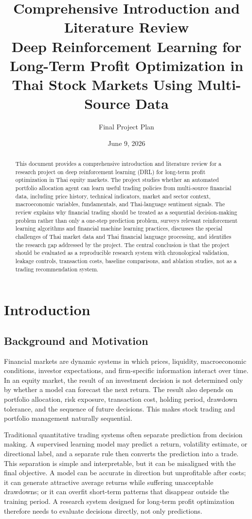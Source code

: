 \documentclass[11pt]{article}
\title{\textbf{Comprehensive Introduction and Literature Review}\\
Deep Reinforcement Learning for Long-Term Profit Optimization in Thai Stock Markets Using Multi-Source Data}
\author{Final Project Plan}
\date{June 9, 2026}
\begin{document}
\maketitle

\begin{abstract}
This document provides a comprehensive introduction and literature review for a research project on deep reinforcement learning (DRL) for long-term profit optimization in Thai equity markets. The project studies whether an automated portfolio allocation agent can learn useful trading policies from multi-source financial data, including price history, technical indicators, market and sector context, macroeconomic variables, fundamentals, and Thai-language sentiment signals. The review explains why financial trading should be treated as a sequential decision-making problem rather than only a one-step prediction problem, surveys relevant reinforcement learning algorithms and financial machine learning practices, discusses the special challenges of Thai market data and Thai financial language processing, and identifies the research gap addressed by the project. The central conclusion is that the project should be evaluated as a reproducible research system with chronological validation, leakage controls, transaction costs, baseline comparisons, and ablation studies, not as a trading recommendation system.
\end{abstract}

\tableofcontents
\newpage

\section{Introduction}

\subsection{Background and Motivation}
Financial markets are dynamic systems in which prices, liquidity, macroeconomic conditions, investor expectations, and firm-specific information interact over time. In an equity market, the result of an investment decision is not determined only by whether a model can forecast the next return. The result also depends on portfolio allocation, risk exposure, transaction cost, holding period, drawdown tolerance, and the sequence of future decisions. This makes stock trading and portfolio management naturally sequential.

Traditional quantitative trading systems often separate prediction from decision making. A supervised learning model may predict a return, volatility estimate, or directional label, and a separate rule then converts the prediction into a trade. This separation is simple and interpretable, but it can be misaligned with the final objective. A model can be accurate in direction but unprofitable after costs; it can generate attractive average returns while suffering unacceptable drawdowns; or it can overfit short-term patterns that disappear outside the training period. A research system designed for long-term profit optimization therefore needs to evaluate decisions directly, not only predictions.
\end{document}

